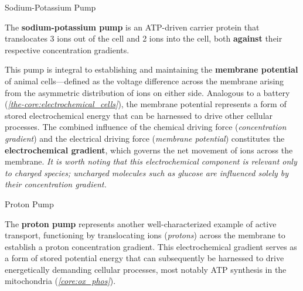 \documentclass[10pt]{article}
\begin{document}
    \begin{core}{Sodium-Potassium Pump}

      The \textbf{sodium-potassium pump} is an ATP-driven carrier protein that translocates 3  ions out of the cell and 2  ions into the cell, both \textbf{against} their respective concentration gradients.

      This pump is integral to establishing and maintaining the \textbf{membrane potential} of animal cells---defined as the voltage difference across the membrane arising from the asymmetric distribution of ions on either side. Analogous to a battery (\textit{\autoref{the-core:electrochemical_cells}}), the membrane potential represents a form of stored electrochemical energy that can be harnessed to drive other cellular processes. The combined influence of the chemical driving force (\textit{concentration gradient}) and the electrical driving force (\textit{membrane potential}) constitutes the \textbf{electrochemical gradient}, which governs the net movement of ions across the membrane. \textit{It is worth noting that this electrochemical component is relevant only to charged species; uncharged molecules such as glucose are influenced solely by their concentration gradient.}


    \end{core}

    \begin{core}{Proton Pump}

      The \textbf{proton pump} represents another well-characterized example of active transport, functioning by translocating  ions (\textit{protons}) across the membrane to establish a proton concentration gradient. This electrochemical gradient serves as a form of stored potential energy that can subsequently be harnessed to drive energetically demanding cellular processes, most notably ATP synthesis in the mitochondria (\textit{\autoref{core:ox_phos}}).


    \end{core}
\end{document}
